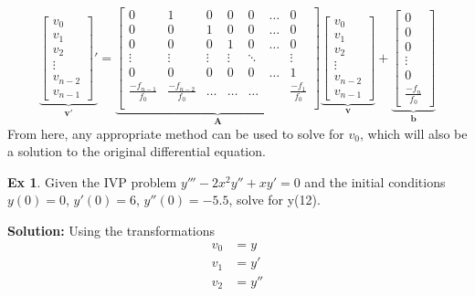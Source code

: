 \documentclass[]{article}
\theoremstyle{definition}
\newtheorem{exmp}{Ex}[section]
\numberwithin{equation}{section}
\begin{document}
\begin{equation*}
	\underbrace{\begin{bmatrix}
	v_0 \\
	v_1 \\
	v_2 \\
	\vdots \\
	v_{n-2} \\
	v_{n-1} 
	\end{bmatrix}'}_{\mathbf{v'}} =
	\underbrace{\begin{bmatrix}
	0 &1  & 0 & 0 &0 &  \ldots & 0  \\
	0 & 0 & 1 & 0 & 0  & \ldots & 0\\
	0 & 0 & 0 & 1 & 0 & \ldots &0 \\
	\vdots & \vdots & \vdots  & \vdots & \ddots & &  \vdots\\
	0 & 0 & 0 & 0 & 0 & \ldots & 1 \\  
	\frac{-f_{n-1}}{f_0} & \frac{-f_{n-2}}{f_0} & \ldots &  \ldots & \ldots & & \frac{-f_{1}}{f_0} \\
	\end{bmatrix}}_{\mathbf{A}}
	\underbrace{\begin{bmatrix}
		v_0 \\
	v_1 \\
	v_2 \\
	\vdots \\
	v_{n-2} \\
	v_{n-1} 
	\end{bmatrix}}_{\mathbf{v}} + 
		\underbrace{\begin{bmatrix}
	0 \\
	0 \\
	0 \\
	\vdots \\
	0 \\
	\frac{-f_n}{f_0} 
	\end{bmatrix}}_{\mathbf{b}}
\end{equation*}
From here, any appropriate method can be used to solve for $v_0$, which will also be a solution to the original differential equation.
\begin{exmp}
	Given the IVP problem $y''' -2x^2 y'' + xy' = 0$ and the initial conditions $y(0) = 0$,  $y'(0) = 6$, $y''(0)=-5.5$, solve for y(12).
\end{exmp}
\textbf{Solution:} Using the transformations
\begin{align*}
	v_0 &= y \\
	v_1 &= y' \\
	v_2 &= y'' \\
\end{align*}
\end{document}
